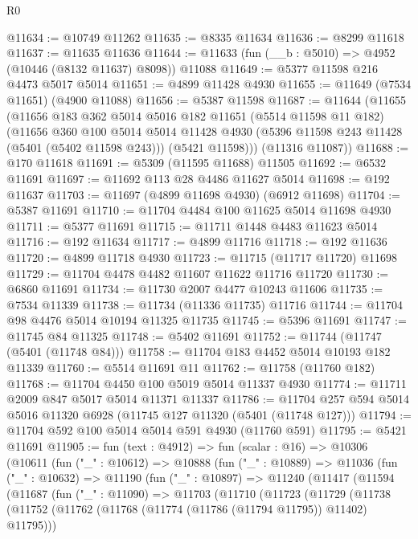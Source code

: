 \begin{lexlean}{R0}
\begin{coremodule}
@11634 := @10749 @11262
@11635 := @8335 @11634
@11636 := @8299 @11618
@11637 := @11635 @11636
@11644 := @11633 (fun (__b : @5010) => @4952 (@10446 (@8132 @11637) @8098)) @11088
@11649 := @5377 @11598 @216 @4473 @5017 @5014
@11651 := @4899 @11428 @4930
@11655 := @11649 (@7534 @11651) (@4900 @11088)
@11656 := @5387 @11598
@11687 := @11644
    (@11655
      (@11656
        @183
        @362
        @5014
        @5016
        @182
        @11651
        (@5514 @11598 @11 @182)
        (@11656
          @360
          @100
          @5014
          @5014
          @11428
          @4930
          (@5396 @11598 @243 @11428 (@5401 (@5402 @11598 @243)))
          (@5421 @11598)))
      (@11316 @11087))
@11688 := @170 @11618
@11691 := @5309 (@11595 @11688) @11505
@11692 := @6532 @11691
@11697 := @11692 @113 @28 @4486 @11627 @5014
@11698 := @192 @11637
@11703 := @11697 (@4899 @11698 @4930) (@6912 @11698)
@11704 := @5387 @11691
@11710 := @11704 @4484 @100 @11625 @5014 @11698 @4930
@11711 := @5377 @11691
@11715 := @11711 @1448 @4483 @11623 @5014
@11716 := @192 @11634
@11717 := @4899 @11716
@11718 := @192 @11636
@11720 := @4899 @11718 @4930
@11723 := @11715 (@11717 @11720) @11698
@11729 := @11704 @4478 @4482 @11607 @11622 @11716 @11720
@11730 := @6860 @11691
@11734 := @11730 @2007 @4477 @10243 @11606
@11735 := @7534 @11339
@11738 := @11734 (@11336 @11735) @11716
@11744 := @11704 @98 @4476 @5014 @10194 @11325 @11735
@11745 := @5396 @11691
@11747 := @11745 @84 @11325
@11748 := @5402 @11691
@11752 := @11744 (@11747 (@5401 (@11748 @84)))
@11758 := @11704 @183 @4452 @5014 @10193 @182 @11339
@11760 := @5514 @11691 @11
@11762 := @11758 (@11760 @182)
@11768 := @11704 @4450 @100 @5019 @5014 @11337 @4930
@11774 := @11711 @2009 @847 @5017 @5014 @11371 @11337
@11786 := @11704 @257 @594 @5014 @5016 @11320 @6928 (@11745 @127 @11320 (@5401 (@11748 @127)))
@11794 := @11704 @592 @100 @5014 @5014 @591 @4930 (@11760 @591)
@11795 := @5421 @11691
@11905 := fun (text : @4912) =>
  fun (scalar : @16) =>
  @10306
    (@10611
      (fun ("_" : @10612) =>
      @10888
        (fun ("_" : @10889) =>
        @11036
          (fun ("_" : @10632) =>
          @11190
            (fun ("_" : @10897) =>
            @11240
              (@11417
                (@11594
                  (@11687
                    (fun ("_" : @11090) =>
                    @11703
                      (@11710
                        (@11723
                          (@11729
                            (@11738
                              (@11752
                                (@11762 (@11768 (@11774 (@11786 (@11794 @11795)) @11402) @11795)))

\end{coremodule}
\end{lexlean}
